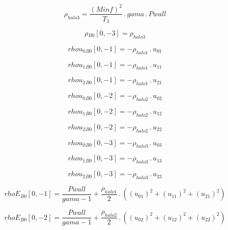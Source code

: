 \documentclass{article}
\begin{document}
\begin{dmath}\rho_{halo 3} = \frac{\left(Minf \right)^{2}}{T_{3}} \,.\, gama \,.\, Pwall\end{dmath}

\begin{dmath}{\rho{_{B0}}}[{0,-3}] = \rho_{halo 3}\end{dmath}

\begin{dmath}{rhou_{0}{_{B0}}}[{0,-1}] = - \rho_{halo 1} \,.\, u_{01}\end{dmath}

\begin{dmath}{rhou_{1}{_{B0}}}[{0,-1}] = - \rho_{halo 1} \,.\, u_{11}\end{dmath}

\begin{dmath}{rhou_{2}{_{B0}}}[{0,-1}] = - \rho_{halo 1} \,.\, u_{21}\end{dmath}

\begin{dmath}{rhou_{0}{_{B0}}}[{0,-2}] = - \rho_{halo 2} \,.\, u_{02}\end{dmath}

\begin{dmath}{rhou_{1}{_{B0}}}[{0,-2}] = - \rho_{halo 2} \,.\, u_{12}\end{dmath}

\begin{dmath}{rhou_{2}{_{B0}}}[{0,-2}] = - \rho_{halo 2} \,.\, u_{22}\end{dmath}

\begin{dmath}{rhou_{0}{_{B0}}}[{0,-3}] = - \rho_{halo 3} \,.\, u_{03}\end{dmath}

\begin{dmath}{rhou_{1}{_{B0}}}[{0,-3}] = - \rho_{halo 3} \,.\, u_{13}\end{dmath}

\begin{dmath}{rhou_{2}{_{B0}}}[{0,-3}] = - \rho_{halo 3} \,.\, u_{23}\end{dmath}

\begin{dmath}{rhoE{_{B0}}}[{0,-1}] = \frac{Pwall}{gama - 1} + \frac{\rho_{halo 1}}{2} \,.\, \left(\left(u_{01} \right)^{2} + \left(u_{11} \right)^{2} + \left(u_{21} \right)^{2}\right)\end{dmath}

\begin{dmath}{rhoE{_{B0}}}[{0,-2}] = \frac{Pwall}{gama - 1} + \frac{\rho_{halo 2}}{2} \,.\, \left(\left(u_{02} \right)^{2} + \left(u_{12} \right)^{2} + \left(u_{22} \right)^{2}\right)\end{dmath}
\end{document}
